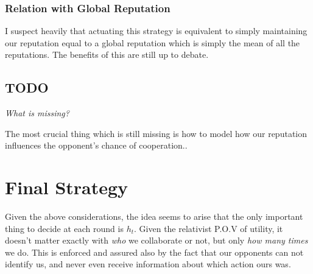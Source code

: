 \documentclass[10pt,fleqn]{article}
\begin{document}
\subsubsection{Relation with Global Reputation}
I suspect heavily that actuating this strategy is equivalent to simply
maintaining our reputation equal to a global reputation which is simply the mean
of all the reputations. The benefits of this are still up to debate.

\subsection{TODO}
\emph{What is missing?}

The most crucial thing which is still missing is how to model how our reputation
influences the opponent's chance of cooperation..

\section{Final Strategy}

Given the above considerations, the idea seems to arise that the only important
thing to decide at each round is $h_t$. Given the relativist P.O.V of utility, it
doesn't matter exactly with \emph{who} we collaborate or not, but only \emph{how
many times} we do. This is enforced and assured also by the fact that our
opponents can not identify us, and never even receive information about which
action ours was.
\end{document}
